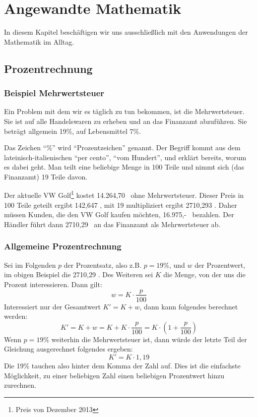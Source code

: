 
\chapter{Angewandte Mathematik}

In diesem Kapitel beschäftigen wir uns ausschließlich mit den Anwendungen der Mathematik im Alltag. 


\section{Prozentrechnung}

\subsection{Beispiel Mehrwertsteuer}

Ein Problem mit dem wir es täglich zu tun bekommen, ist die Mehrwertsteuer. Sie ist auf alle Handelswaren zu erheben und an das Finanzamt abzuführen. Sie beträgt allgemein 19\%, auf Lebensmittel 7\%. 

Das Zeichen "`\%"' wird "`Prozentzeichen"' genannt. Der Begriff kommt aus dem lateinisch-italienischen "`per cento"', "`vom Hundert"', und erklärt bereits, worum es dabei geht. Man teilt eine beliebige Menge in 100 Teile und nimmt sich (das Finanzamt) 19 Teile davon. 

Der aktuelle VW Golf\footnote{Preis von Dezember 2013} kostet 14.264,70 \officialeuro\  ohne Mehrwertsteuer. Dieser Preis in 100 Teile geteilt ergibt 142,647 \officialeuro, mit 19 multipliziert ergibt 2710,293 \officialeuro. Daher müssen Kunden, die den VW Golf kaufen möchten, 16.975,- \officialeuro\  bezahlen. Der Händler führt dann 2710,29 \officialeuro\  an das Finanzamt als Mehrwertsteuer ab.

\subsection{Allgemeine Prozentrechnung}

Sei im Folgenden $p$ der Prozentsatz, also z.B. $p=19\%$, und $w$ der Prozentwert, im obigen Beispiel die 2710,29 \officialeuro. Des Weiteren sei $K$ die Menge, von der uns die Prozent interessieren. Dann gilt:
\[
w = K\cdot \frac{p}{100}
\]
Interessiert nur der Gesamtwert $K' = K+w$, dann kann folgendes berechnet werden:
\[
K' = K+w = K+K\cdot \frac{p}{100} = K\cdot \left(1+\frac{p}{100}\right)
\]
Wenn $p=19\%$ weiterhin die Mehrwertsteuer ist, dann würde der letzte Teil der Gleichung ausgerechnet folgendes ergeben:
\[
K' = K\cdot 1,19
\]
Die 19\% tauchen also hinter dem Komma der Zahl auf. Dies ist die einfachste Möglichkeit, zu einer beliebigen Zahl einen beliebigen Prozentwert hinzu zurechnen.

